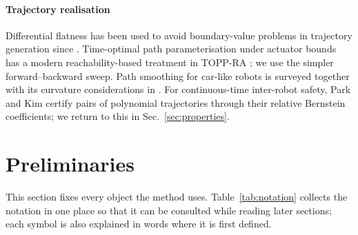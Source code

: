 \documentclass[conference]{IEEEtran}
\theoremstyle{plain}
\theoremstyle{definition}
\begin{document}
\paragraph*{Trajectory realisation}
Differential flatness has been used to avoid boundary-value problems in trajectory
generation since \cite{mellinger2011}. Time-optimal path parameterisation under actuator
bounds has a modern reachability-based treatment in TOPP-RA \cite{toppra2018}; we use the
simpler forward--backward sweep. Path smoothing for car-like robots is surveyed together
with its curvature considerations in \cite{elbanhawi2015}. For continuous-time inter-robot
safety, Park and Kim \cite{parkkim2020} certify pairs of polynomial trajectories through
their relative Bernstein coefficients; we return to this in Sec.~\ref{sec:properties}.

\section{Preliminaries}
\label{sec:prelim}

This section fixes every object the method uses. Table~\ref{tab:notation} collects the
notation in one place so that it can be consulted while reading later sections; each symbol
is also explained in words where it is first defined.
\end{document}
